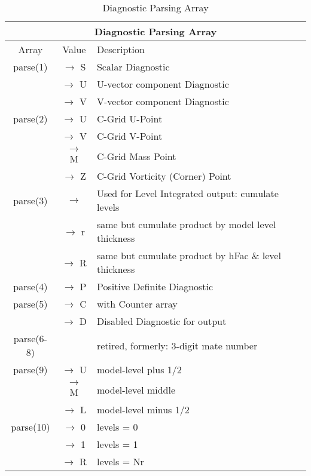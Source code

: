 \begin{table}
\caption{Diagnostic Parsing Array}
\label{tab:diagnostics:gdiag.tabl}
\begin{center}
\begin{tabular}{ |c|c|l| }
\hline
\multicolumn{3}{|c|}{\bf Diagnostic Parsing Array} \\ 
\hline
\hline
Array & Value & Description \\
\hline
 parse(1)  & $\rightarrow$ S &  Scalar Diagnostic                 \\ 
           & $\rightarrow$ U &  U-vector component Diagnostic     \\ 
           & $\rightarrow$ V &  V-vector component Diagnostic     \\ \hline
 parse(2)  & $\rightarrow$ U &  C-Grid U-Point                    \\ 
           & $\rightarrow$ V &  C-Grid V-Point                    \\ 
           & $\rightarrow$ M &  C-Grid Mass Point                 \\ 
           & $\rightarrow$ Z &  C-Grid Vorticity (Corner) Point   \\ \hline
 parse(3)  & $\rightarrow$   &  Used for Level Integrated output: cumulate levels \\
           & $\rightarrow$ r &  same but cumulate product by model level thickness \\
           & $\rightarrow$ R &  same but cumulate product by hFac \& level thickness \\ \hline
 parse(4)  & $\rightarrow$ P &  Positive Definite Diagnostic      \\ \hline
 parse(5)  & $\rightarrow$ C &  with Counter array                \\
           & $\rightarrow$ D &  Disabled Diagnostic for output    \\ \hline
 parse(6-8)&                 &  retired, formerly: 3-digit mate number \\ \hline
 parse(9)  & $\rightarrow$ U &  model-level plus 1/2  \\
           & $\rightarrow$ M &  model-level middle  \\
           & $\rightarrow$ L &  model-level minus 1/2  \\ \hline
 parse(10) & $\rightarrow$ 0 &  levels = 0  \\
           & $\rightarrow$ 1 &  levels = 1  \\
           & $\rightarrow$ R &  levels = Nr  \\

\end{tabular}
\end{center}
\end{table}
